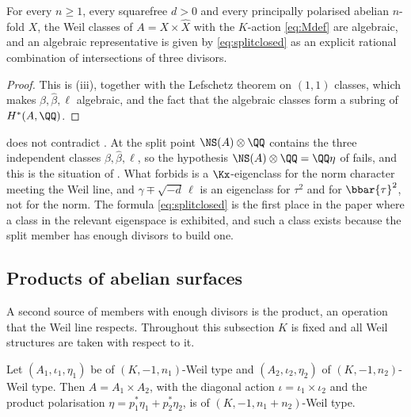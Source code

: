 \begin{corollary}\label{cor:splitalgebraic}
For every $n\ge1$, every squarefree $d>0$ and every principally polarised
abelian $n$-fold $X$, the Weil classes of $A=X\times\widehat{X}$ with the
$K$-action \eqref{eq:Mdef} are algebraic, and an algebraic representative is
given by \eqref{eq:splitclosed} as an explicit rational combination of
intersections of three divisors.
\end{corollary}

\begin{proof}
This is (iii), together with the Lefschetz theorem on
$(1,1)$ classes, which makes $\beta,\widehat{\beta},\ell$ algebraic, and the
fact that the algebraic classes form a subring of $H^{*}(A,\QQ)$.
\end{proof}

\begin{remark}\label{rem:splitconsistent}
 does not contradict . At the
split point $\NS(A)\otimes\QQ$ contains the three independent classes
$\beta,\widehat{\beta},\ell$, so the hypothesis
$\NS(A)\otimes\QQ=\QQ\eta$ of  fails, and this is the
situation of \cite[Remark~2.5]{paperIII}. What  forbids is a
$\Kx$-eigenclass for the norm character meeting the Weil line, and
$\gamma\mp\sqrt{-d}\,\ell$ is an eigenclass for $\tau^{2}$ and for
$\bbar{\tau}^{2}$, not for the norm. The formula \eqref{eq:splitclosed} is
the first place in the paper where a class in the relevant eigenspace is
exhibited, and such a class exists because the split member has enough
divisors to build one.
\end{remark}

\subsection{Products of abelian surfaces}\label{ssec:products}

A second source of members with enough divisors is the product, an operation
that the Weil line respects. Throughout this subsection $K$ is fixed and all
Weil structures are taken with respect to it.

\begin{lemma}\label{lem:prodweil}
Let $(A_{1},\iota_{1},\eta_{1})$ be of $(K,-1,n_{1})$-Weil type and
$(A_{2},\iota_{2},\eta_{2})$ of $(K,-1,n_{2})$-Weil type. Then
$A=A_{1}\times A_{2}$, with the diagonal action
$\iota=\iota_{1}\times\iota_{2}$ and the product polarisation
$\eta=p_{1}^{*}\eta_{1}+p_{2}^{*}\eta_{2}$, is of
$(K,-1,n_{1}+n_{2})$-Weil type.
\end{lemma}


